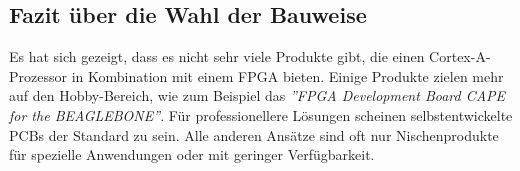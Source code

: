 %
%
%
%
%



\subsection{Fazit über die Wahl der Bauweise}
Es hat sich gezeigt, dass es nicht sehr viele Produkte gibt, die einen Cortex-A-Prozessor in Kombination mit einem FPGA bieten.
Einige Produkte zielen mehr auf den Hobby-Bereich, wie zum Beispiel das \textit{''FPGA Development Board CAPE for the BEAGLEBONE''}.
Für professionellere Lösungen scheinen selbstentwickelte PCBs der Standard zu sein.
Alle anderen Ansätze sind oft nur Nischenprodukte für spezielle Anwendungen oder mit geringer Verfügbarkeit.

